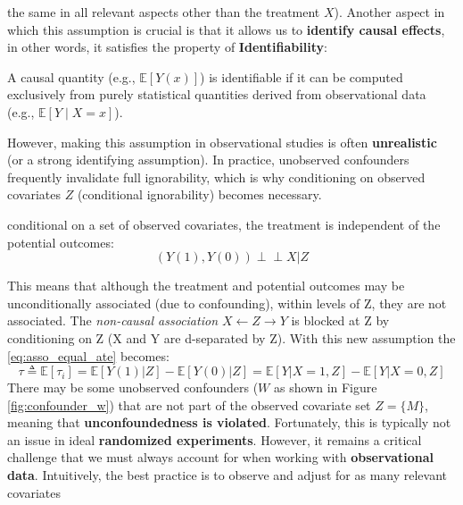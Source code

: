 the same in all relevant aspects other than the treatment $X$).
\newline
Another aspect in which this assumption is crucial is that it allows us to \textbf{identify causal effects}, in other words, it satisfies the property of \textbf{Identifiability}:
\begin{definition}[Identifiability]
\label{def:identifiability}
A causal quantity (e.g., $\mathbb{E}[Y(x)]$) is identifiable if it can be computed exclusively from purely statistical quantities derived from observational data (e.g., $\mathbb{E}[Y \mid X = x]$).
\end{definition}
However, making this assumption in observational studies is often \textbf{unrealistic} 
(or a strong identifying assumption). In practice, unobserved confounders frequently invalidate 
full ignorability, which is why conditioning on observed covariates $Z$ (conditional ignorability) 
becomes necessary.
\begin{definition}
    conditional on a set of observed covariates, the treatment is independent of the potential outcomes:
    \begin{equation}
        \left(Y(1), Y(0)\right) \perp\!\!\!\perp X | Z
    \end{equation}
\end{definition}
This means that although the treatment and potential outcomes may be unconditionally associated
(due to confounding), within levels of Z, they are not associated. The 
\textit{non-causal association $X \leftarrow Z \rightarrow Y$}
is blocked at Z by conditioning on Z (X and Y are d-separated by Z).
\newline
With this new assumption the \ref{eq:asso_equal_ate} becomes:
\begin{equation}
    \tau \triangleq \mathbb{E}[\tau_i] = \mathbb{E}[Y(1)|Z] - \mathbb{E}[Y(0)|Z] = \mathbb{E}[Y \vert{} X = 1,Z] - \mathbb{E}[Y \vert{} X = 0,Z]
\end{equation}
\newline
There may be some unobserved confounders ($W$ as shown in Figure \ref{fig:confounder_w}) that 
are not part of the observed covariate set $Z = \{M\}$, meaning that 
\textbf{unconfoundedness is violated}. Fortunately, this is typically not an issue in ideal 
\textbf{randomized experiments}. However, it remains a critical challenge that we must always 
account for when working with \textbf{observational data}. Intuitively, the best practice is to observe and adjust for as many relevant covariates 
